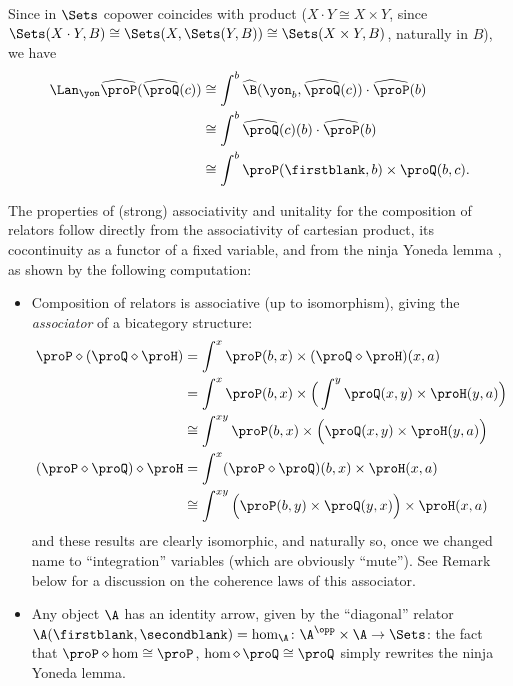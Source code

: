 Since in $\Sets$ copower coincides with product (\ie $X\cdot Y\cong X\times Y$, since $\Sets(X\cdot Y,B)\cong \Sets(X,\Sets(Y,B))\cong \Sets(X\times Y,B)$, naturally in $B$), we have
\begin{align*}
\Lan_\yon \widehat{\proP}(\widehat{\proQ}(c)) &\cong \int^b \widehat{\B}(\yon_b,\widehat{\proQ}(c))\cdot \widehat{\proP}(b)\\
&\cong \int^b \widehat{\proQ}(c)(b)\cdot \widehat{\proP}(b)\\
&\cong \int^b \proP(\firstblank,b)\times \proQ(b,c).
\end{align*}
\begin{remark}\label{profundefs}
The properties of (strong) associativity and unitality for the composition of relators follow directly from the associativity of cartesian product, its cocontinuity as a functor of a fixed variable, and from the ninja Yoneda lemma , as shown by the following computation:
\begin{itemize}
\item Composition of relators is associative (up to isomorphism), giving the \emph{associator} of a bicategory structure:
\begin{align*}
\proP \diamond (\proQ \diamond \proH) &=\int^x\proP(b,x)\times (\proQ \diamond \proH)(x,a)\\
&=\int^x \proP(b,x)\times\Big( \int^y \proQ(x,y)\times\proH(y,a)\Big)\\
&\cong \int^{xy}\proP(b,x)\times\Big( \proQ(x,y)\times\proH(y,a)\Big)\\
(\proP \diamond \proQ) \diamond \proH &= \int^x(\proP \diamond  \proQ)(b,x)\times\proH(x,a)\\
&\cong \int^{xy}\Big(\proP(b,y)\times\proQ(y,x)\Big)\times\proH(x,a)
\end{align*}
and these results are clearly isomorphic, and naturally so, once we changed name to ``integration'' variables (which are obviously ``mute''). See Remark  below for a discussion on the coherence laws of this associator.
\item Any object $\A$ has an identity arrow, given by the ``diagonal'' relator $\A(\firstblank,\secondblank)=\hom_{\A}\colon \A^\opp\times \A\to \Sets$: the fact that $\proP \diamond \hom\cong\proP$, $\hom \diamond\, \proQ\cong\proQ$ simply rewrites the ninja Yoneda lemma.
\end{itemize}
\end{remark}
